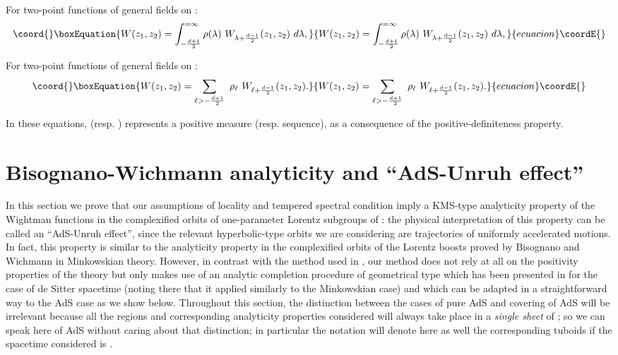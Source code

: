 \documentclass[a4paper,a4paper]{article}
\let\UnmodifSec=\section
\renewcommand{\section}{\setcounter{equation}{0}\UnmodifSec}
\def\ZZ{{\cal Z}}
\def\wt{\widetilde}
\begin{document}
\vskip 0.2cm
For two-point functions of general fields on \myHighlight{$\wt X_d$}\coordHE{}:
\begin{equation}\coord{}\boxEquation{
W(z_1,z_2) = \int_{-{d+1\over 2}}^{=\infty} \rho(\lambda)
\ W_{\lambda + \frac{d-1}{2}}(z_1,z_2)\  d\lambda,
}{
W(z_1,z_2) = \int_{-{d+1\over 2}}^{=\infty} \rho(\lambda)
\ W_{\lambda + \frac{d-1}{2}}(z_1,z_2)\  d\lambda,
}{ecuacion}\coordE{}\end{equation}

For two-point functions of general fields on \coordHE{}:
\begin{equation}\coord{}\boxEquation{
W(z_1,z_2) = \sum_{\ell > -{d+1\over 2}}\ \rho_{\ell}
\ W_{\ell + \frac{d-1}{2}}(z_1,z_2).
}{
W(z_1,z_2) = \sum_{\ell > -{d+1\over 2}}\ \rho_{\ell}
\ W_{\ell + \frac{d-1}{2}}(z_1,z_2).
}{ecuacion}\coordE{}\end{equation}

In these equations, \myHighlight{$\rho(\lambda)$}\coordHE{} (resp. \myHighlight{$\{\rho_{\ell}\}$}\coordHE{}) represents
a positive measure (resp. sequence), as a consequence of the
positive-definiteness property.

\section{Bisognano-Wichmann analyticity and ``AdS-Unruh effect''}

\label{BWA}
In this section we prove that our assumptions of locality
and tempered spectral condition imply
a KMS-type analyticity property
of the Wightman functions in the complexified orbits of
one-parameter Lorentz subgroups of
\coordHE{}: the physical interpretation of this
property can be called
an ``AdS-Unruh effect'', since the relevant
hyperbolic-type orbits we are considering are
trajectories of uniformly accelerated motions.
In fact, this property is similar to the
analyticity property  in the complexified orbits
of the Lorentz boosts proved by Bisognano
and Wichmann \cite{BW} in Minkowskian theory.
However, in contrast with the method used in \cite{BW},
our method does not rely at all on the positivity properties
of the theory but only makes use of an analytic completion procedure of
geometrical type which has been presented in \cite{BEM}
for the case of de Sitter spacetime (noting there that it applied
similarly to the Minkowskian case) and which can be adapted in a
straightforward way to the AdS case as we show below.
Throughout this section, the distinction between the cases of pure AdS
and covering of AdS will be irrelevant because all the regions
and corresponding analyticity properties considered
will always take place in a {\sl single sheet} of \myHighlight{$\wt X_d$}\coordHE{}; so
we can speak here of AdS
without caring about that distinction;
in particular the notation \myHighlight{$\ZZ_{n\pm}$}\coordHE{} will denote here as well
the corresponding tuboids
\myHighlight{$\wt \ZZ_{n\pm}$}\coordHE{} if the spacetime considered is \myHighlight{$\wt X_d$}\coordHE{}.
\end{document}
